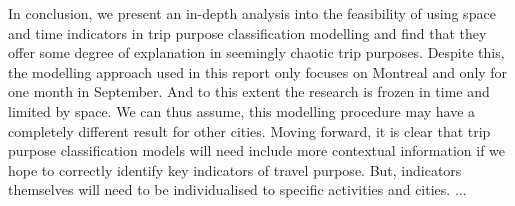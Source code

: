 In conclusion, we present an in-depth analysis into the feasibility of using space and time indicators in trip purpose classification modelling and find that they offer some degree of explanation in seemingly chaotic trip purposes.
Despite this, the modelling approach used in this report only focuses on Montreal and only for one month in September. And to this extent the research is frozen in time and limited by space. We can thus assume, this modelling procedure may have a completely different result for other cities. Moving forward, it is clear that trip purpose classification models will need include more contextual information if we hope to correctly identify key indicators of travel purpose. But, indicators themselves will need to be individualised to specific activities and cities.
...
